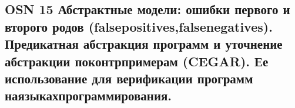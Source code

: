 \subsection{OSN 15 Абстрактные модели: ошибки первого и второго родов (falsepositives,falsenegatives). Предикатная абстракция программ и уточнение абстракции поконтрпримерам (CEGAR). Ее использование для верификации программ
наязыкахпрограммирования.}
